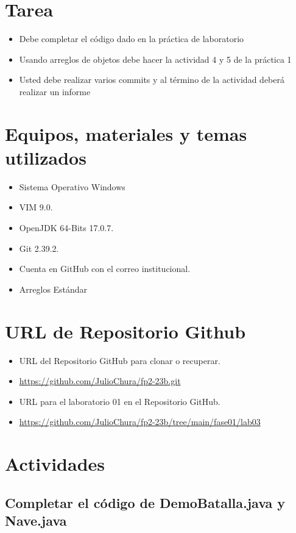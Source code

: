 \documentclass{article}
\begin{document}
	\section{Tarea}
	\begin{itemize}		
		\item 
		Debe completar el código dado en la práctica de laboratorio	
		\item Usando arreglos de objetos debe hacer la actividad 4 y 5 de la práctica 1
		\item Usted debe realizar varios commits y al término de la actividad deberá realizar un informe
	\end{itemize}
	
	\section{Equipos, materiales y temas utilizados}
	\begin{itemize}
		\item Sistema Operativo Windows
		\item VIM 9.0.
		\item OpenJDK 64-Bits 17.0.7.
		\item Git 2.39.2.
		\item Cuenta en GitHub con el correo institucional.
		\item Arreglos Estándar
	\end{itemize}
	
	\section{URL de Repositorio Github}
	\begin{itemize}
		\item URL del Repositorio GitHub para clonar o recuperar.
		\item \url{https://github.com/JulioChura/fp2-23b.git}
		\item URL para el laboratorio 01 en el Repositorio GitHub.
		\item \url{https://github.com/JulioChura/fp2-23b/tree/main/fase01/lab03}
	\end{itemize}
	
	\section{Actividades}
	
	\subsection{Completar el código de DemoBatalla.java y Nave.java}
	
\end{document}
